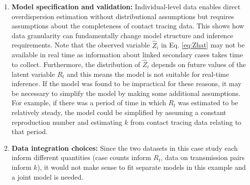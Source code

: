 \documentclass{article}
\begin{document}
\begin{enumerate}
\begin{enumerate}
    \item \textbf{Model specification and validation:} Individual-level data enables direct overdispersion estimation without distributional assumptions but requires assumptions about the completeness of contact tracing data. This shows how data granularity can fundamentally change model structure and inference requirements. Note that the observed variable $\hat{Z}_i$ in Eq. \eqref{eq:Zhat} may not be available in real time as information about linked secondary cases takes time to collect. Furthermore, the distribution of $\hat{Z}_i$ depends on future values of the latent variable $R_t$ and this means the model is not suitable for real-time inference. If the model was found to be impractical for these reasons, it may be necessary to simplify the model by making some additional assumptions. For example, if there was a period of time in which $R_t$ was estimated to be relatively steady, the model could be simplified by assuming a constant reproduction number and estimating $k$ from contact tracing data relating to that period. 

    \item \textbf{Data integration choices:} Since the two datasets in this case study each inform different quantities (case counts inform $R_t$, data on transmission pairs inform $k$), it would not make sense to fit separate models in this example and a joint model is needed. 
\end{enumerate}



\end{enumerate}
\end{document}
